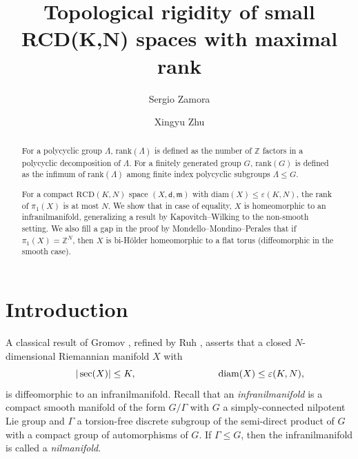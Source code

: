 \documentclass[12pt]{amsart}
\title{Topological rigidity of small RCD(K,N) spaces with maximal rank}
\author{Sergio Zamora}\address{Oregon State University}
\author{Xingyu Zhu} \address{Michigan State University}
\theoremstyle{definition}
\numberwithin{equation}{section}
\newcommand{\rank}{{\text{rank}}}
\newcommand{\diam}{{\text {diam}}}
\newcommand{\rcd}{\text{RCD}}
\newcommand{\mm}{\mathfrak{m}}
\begin{document}
\begin{abstract}
For a polycyclic group $\Lambda$,  $\rank (\Lambda )$ is defined as the number of $\mathbb{Z}$ factors in a polycyclic decomposition of $\Lambda$. For a finitely generated group $G$,  $\rank (G)$ is defined as the infimum of $ \rank (\Lambda )$ among finite index polycyclic subgroups $\Lambda \leq G$.

For a compact $\rcd (K,N)$ space $(X,\mathsf{d}, \mm)$ with $\diam (X) \leq \varepsilon (K,N)$,  the rank of $\pi_1(X)$ is at most $N$. We show that in case of equality, $X$ is homeomorphic to an infranilmanifold, generalizing a result by Kapovitch--Wilking to the non-smooth setting. We also fill a gap in the proof  by Mondello--Mondino--Perales  that if $\pi_1(X) = \mathbb{Z}^N$, then $X$ is bi-H\"older homeomorphic to a flat torus (diffeomorphic in the smooth case). 
\end{abstract}


\maketitle














\section{Introduction}

A classical result of Gromov \cite{gromov}, refined by Ruh \cite{ruh}, asserts that a closed $N$-dimensional Riemannian manifold $X$ with 
\[          \hspace{0.8cm}           \vert \sec (X) \vert \leq K , \hspace{3cm} \diam (X) \leq \varepsilon (K,N),  \]
is diffeomorphic to an infranilmanifold.   Recall that an \emph{infranilmanifold} is  a compact smooth manifold of the form $G / \Gamma$ with  $G$ a simply-connected nilpotent Lie group and $\Gamma$ a torsion-free discrete subgroup of the semi-direct product of $G$ with a compact group of automorphisms of $G$. If $\Gamma \leq G$, then the infranilmanifold is called a \textit{nilmanifold}.
\end{document}
